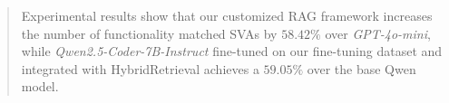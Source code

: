 \documentclass[conference,9pt]{IEEEtran}
\begin{document}
\begin{abstract}
Experimental results show that our customized RAG framework increases the number of functionality matched SVAs by $58.42 \%$ over \textit{GPT-4o-mini}, while \textit{Qwen2.5-Coder-7B-Instruct} fine-tuned on our fine-tuning dataset and integrated with HybridRetrieval achieves a $59.05 \%$ over the base Qwen model.
\end{abstract}
\end{document}

